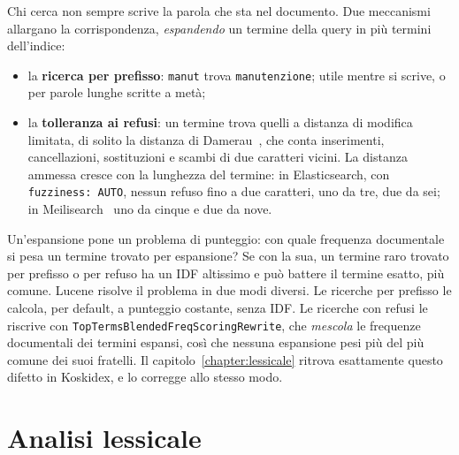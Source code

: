 Chi cerca non sempre scrive la parola che sta nel documento. Due meccanismi
allargano la corrispondenza, \emph{espandendo} un termine della query in più
termini dell'indice:
\begin{itemize}
  \item la \textbf{ricerca per prefisso}: \texttt{manut} trova
        \texttt{manutenzione}; utile mentre si scrive, o per parole lunghe
        scritte a metà;
  \item la \textbf{tolleranza ai refusi}: un termine trova quelli a distanza di
        modifica limitata, di solito la distanza di Damerau~\cite{damerau1964},
        che conta inserimenti, cancellazioni, sostituzioni e scambi di due
        caratteri vicini. La distanza ammessa cresce con la lunghezza del
        termine: in Elasticsearch, con \texttt{fuzziness: AUTO}, nessun refuso
        fino a due caratteri, uno da tre, due da sei; in
        Meilisearch~\cite{meili-typo} uno da cinque e due da nove.
\end{itemize}

Un'espansione pone un problema di punteggio: con quale frequenza documentale si
pesa un termine trovato per espansione? Se con la sua, un termine raro trovato per
prefisso o per refuso ha un IDF altissimo e può battere il termine esatto, più
comune. Lucene risolve il problema in due modi diversi. Le ricerche per prefisso
le calcola, per default, a punteggio costante, senza IDF. Le ricerche con refusi
le riscrive con \texttt{TopTermsBlendedFreqScoringRewrite}, che \emph{mescola} le
frequenze documentali dei termini espansi, così che nessuna espansione pesi più
del più comune dei suoi fratelli. Il capitolo~\ref{chapter:lessicale} ritrova
esattamente questo difetto in Koskidex, e lo corregge allo stesso modo.

\section{Analisi lessicale}\label{sec:analisi}

